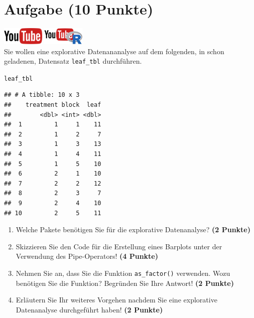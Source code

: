 \documentclass[a4paper, 10pt]{scrartcl}\usepackage[]{graphicx}\usepackage[]{xcolor}
\makeatletter
\newcommand{\hlstd}[1]{\textcolor[rgb]{0.345,0.345,0.345}{#1}}%
\newenvironment{kframe}{%
 \def\at@end@of@kframe{}%
 \ifinner\ifhmode%
  \def\at@end@of@kframe{\end{minipage}}%
  \begin{minipage}{\columnwidth}%
 \fi\fi%
 \def\FrameCommand##1{\hskip\@totalleftmargin \hskip-\fboxsep
 \colorbox{shadecolor}{##1}\hskip-\fboxsep
     \hskip-\linewidth \hskip-\@totalleftmargin \hskip\columnwidth}%
 \MakeFramed {\advance\hsize-\width
   \@totalleftmargin\z@ \linewidth\hsize
   \@setminipage}}%
 {\par\unskip\endMakeFramed%
 \at@end@of@kframe}
\newenvironment{knitrout}{}{} %
\makeatother
\begin{document}
 
\clearpage

\section{Aufgabe \hfill (10 Punkte)}

\hfill\href{https://youtu.be/WIgK_Oj_NW0}{\includegraphics[width =
  2cm]{img/youtube}}
\hspace{2Ex}
\href{https://youtu.be/JCdL7JrZo9o}{\includegraphics[width =
  2cm]{img/youtube_R}}\\[1Ex]


Sie wollen eine explorative Datenananalyse auf dem folgenden, in \Rlogo schon geladenen, Datensatz \texttt{leaf\_tbl} durchf{\"u}hren.



\begin{knitrout}
\color{fgcolor}\begin{kframe}
\begin{alltt}
\hlstd{leaf_tbl}
\end{alltt}
\begin{verbatim}
## # A tibble: 10 x 3
##    treatment block  leaf
##        <dbl> <int> <dbl>
##  1         1     1    11
##  2         1     2     7
##  3         1     3    13
##  4         1     4    11
##  5         1     5    10
##  6         2     1    10
##  7         2     2    12
##  8         2     3     7
##  9         2     4    10
## 10         2     5    11
\end{verbatim}
\end{kframe}
\end{knitrout}

\begin{enumerate}
\item Welche \Rlogo Pakete ben{\"o}tigen Sie f{\"u}r die explorative Datenanalyse?
  \textbf{(2 Punkte)} 
\item Skizzieren Sie den \Rlogo Code f{\"u}r die Erstellung eines
  Barplots unter der Verwendung des Pipe-Operators! \textbf{(4 Punkte)}
\item Nehmen Sie an, dass Sie die Funktion \texttt{as\_factor()}
  verwenden. Wozu ben{\"o}tigen Sie die Funktion? Begr{\"u}nden Sie Ihre Antwort!
  \textbf{(2 Punkte)}
\item Erl{\"a}utern Sie Ihr weiteres Vorgehen nachdem Sie eine explorative
  Datenanalyse durchgef{\"u}hrt haben! \textbf{(2 Punkte)}
\end{enumerate}
\end{document}
